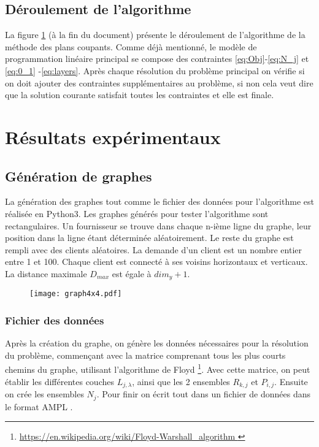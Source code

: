 \documentclass[letterpaper]{article}
\begin{document}
\subsection{Déroulement de l'algorithme}
La figure \ref{fig:algo} (à la fin du document) présente le déroulement de l'algorithme de la méthode des plans coupants. Comme déjà mentionné, le modèle de programmation linéaire principal se compose des contraintes \eqref{eq:Obj}-\eqref{eq:N_j} et \eqref{eq:0_1} -\eqref{eq:layers}. Après chaque résolution du problème principal on vérifie si on doit ajouter des contraintes supplémentaires au problème, si non cela veut dire que la solution courante satisfait toutes les contraintes et elle est finale.
\section{Résultats expérimentaux}
\subsection{Génération de graphes}
La génération des graphes tout comme le fichier des données pour l'algorithme est réalisée en Python3. Les graphes générés pour tester l'algorithme sont rectangulaires. Un fournisseur se trouve dans chaque n-ième ligne du graphe, leur position dans la ligne étant déterminée aléatoirement. Le reste du graphe est rempli avec des clients aléatoires. La demande d'un client est un nombre entier entre 1 et 100. Chaque client est connecté à ses voisins horizontaux et verticaux. La distance maximale $D_{max}$ est égale à $dim_{y}+1$.
\begin{figure}[h]
	\centering
	\texttt{[image: graph4x4.pdf]}
	\label{fig:algo}
\end{figure}
\subsubsection*{Fichier des données}
Après la création du graphe, on génère les données nécessaires pour la résolution du problème, commençant avec la matrice comprenant tous les plus courts chemins du graphe, utilisant l'algorithme de Floyd \footnote{\url{https://en.wikipedia.org/wiki/Floyd-Warshall_algorithm }}. Avec cette matrice, on peut établir les différentes couches $L_{j,\lambda}$, ainsi que les 2 ensembles $R_{k,j}$ et $P_{i,j}$. Ensuite on crée les ensembles $N_{j}$. Pour finir on écrit tout dans un fichier de données dans le format AMPL \citep*{AMPL}.
\end{document}
